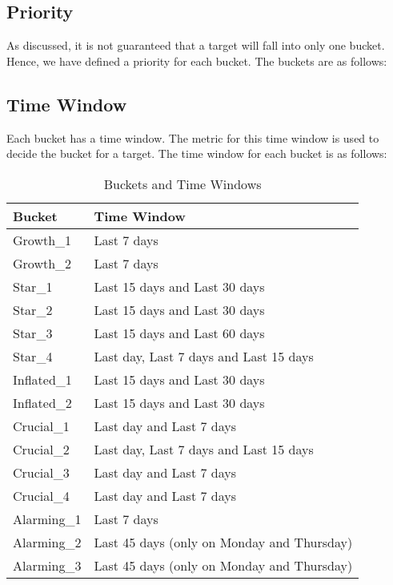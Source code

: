 \subsection{Priority}

As discussed, it is not guaranteed that a target will fall into only one bucket. Hence, we have defined a priority for each bucket. The buckets are as follows:

\subsection{Time Window}

Each bucket has a time window. The metric for this time window is used to decide the bucket for a target. The time window for each bucket is as follows:

\begin{table}[ht]
    \centering
    \begin{tabular}{|l|l|}
        \hline
        \textbf{Bucket} & \textbf{Time Window}                       \\
        \hline
        Growth\_1       & Last 7 days                                \\
        Growth\_2       & Last 7 days                                \\
        Star\_1         & Last 15 days and Last 30 days              \\
        Star\_2         & Last 15 days and Last 30 days              \\
        Star\_3         & Last 15 days and Last 60 days              \\
        Star\_4         & Last day, Last 7 days and Last 15 days     \\
        Inflated\_1     & Last 15 days and Last 30 days              \\
        Inflated\_2     & Last 15 days and Last 30 days              \\
        Crucial\_1      & Last day and Last 7 days                   \\
        Crucial\_2      & Last day, Last 7 days and Last 15 days     \\
        Crucial\_3      & Last day and Last 7 days                   \\
        Crucial\_4      & Last day and Last 7 days                   \\
        Alarming\_1     & Last 7 days                                \\
        Alarming\_2     & Last 45 days (only on Monday and Thursday) \\
        Alarming\_3     & Last 45 days (only on Monday and Thursday) \\
        \hline
    \end{tabular}
    \caption{Buckets and Time Windows}
    \label{tab:bucket_and_time_window}
\end{table}

